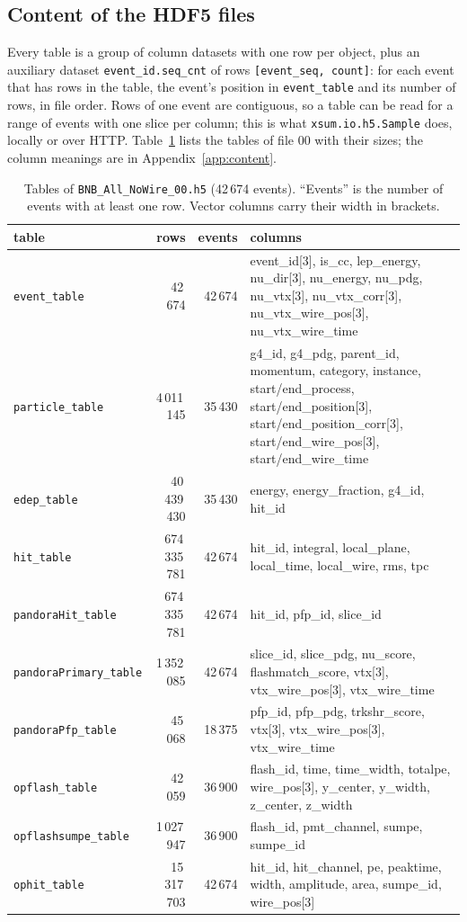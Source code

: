 \documentclass[10pt,letterpaper]{article}
\newcommand{\code}[1]{\texttt{#1}}
\begin{document}
\subsection{Content of the HDF5 files}\label{sec:content}

Every table is a group of column datasets with one row per object, plus an auxiliary dataset
\code{event\_id.seq\_cnt} of rows \code{[event\_seq, count]}: for each event that has rows in the table, the event's
position in \code{event\_table} and its number of rows, in file order. Rows of one event are contiguous, so a table can
be read for a range of events with one slice per column; this is what \code{xsum.io.h5.Sample} does, locally or over
HTTP. Table~\ref{tab:tables} lists the tables of file 00 with their sizes; the column meanings are in
Appendix~\ref{app:content}.

\begin{table}[H]\centering\footnotesize
\caption{Tables of \code{BNB\_All\_NoWire\_00.h5} (42\,674 events). ``Events'' is the number of events with at least one
row. Vector columns carry their width in brackets.}\label{tab:tables}
\begin{tabular}{@{}lrrp{95mm}@{}}\toprule
table & rows & events & columns\\ \midrule
\code{event\_table} & 42\,674 & 42\,674 & event\_id[3], is\_cc, lep\_energy, nu\_dir[3], nu\_energy, nu\_pdg, nu\_vtx[3], nu\_vtx\_corr[3], nu\_vtx\_wire\_pos[3], nu\_vtx\_wire\_time\\
\code{particle\_table} & 4\,011\,145 & 35\,430 & g4\_id, g4\_pdg, parent\_id, momentum, category, instance, start/end\_process, start/end\_position[3], start/end\_position\_corr[3], start/end\_wire\_pos[3], start/end\_wire\_time\\
\code{edep\_table} & 40\,439\,430 & 35\,430 & energy, energy\_fraction, g4\_id, hit\_id\\
\code{hit\_table} & 674\,335\,781 & 42\,674 & hit\_id, integral, local\_plane, local\_time, local\_wire, rms, tpc\\
\code{pandoraHit\_table} & 674\,335\,781 & 42\,674 & hit\_id, pfp\_id, slice\_id\\
\code{pandoraPrimary\_table} & 1\,352\,085 & 42\,674 & slice\_id, slice\_pdg, nu\_score, flashmatch\_score, vtx[3], vtx\_wire\_pos[3], vtx\_wire\_time\\
\code{pandoraPfp\_table} & 45\,068 & 18\,375 & pfp\_id, pfp\_pdg, trkshr\_score, vtx[3], vtx\_wire\_pos[3], vtx\_wire\_time\\
\code{opflash\_table} & 42\,059 & 36\,900 & flash\_id, time, time\_width, totalpe, wire\_pos[3], y\_center, y\_width, z\_center, z\_width\\
\code{opflashsumpe\_table} & 1\,027\,947 & 36\,900 & flash\_id, pmt\_channel, sumpe, sumpe\_id\\
\code{ophit\_table} & 15\,317\,703 & 42\,674 & hit\_id, hit\_channel, pe, peaktime, width, amplitude, area, sumpe\_id, wire\_pos[3]\\
\bottomrule\end{tabular}
\end{table}
\end{document}
